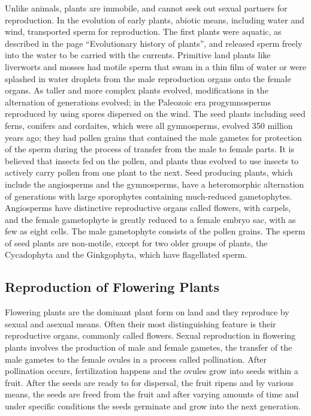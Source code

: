 Unlike animals, plants are immobile, and cannot seek out sexual partners for reproduction. In the evolution of early plants, abiotic means, including water and wind, transported sperm for reproduction. The first plants were aquatic, as described in the page ``Evolutionary history of plants'', and released sperm freely into the water to be carried with the currents. Primitive land plants like liverworts and mosses had motile sperm that swam in a thin film of water or were splashed in water droplets from the male reproduction organs onto the female organs. As taller and more complex plants evolved, modifications in the alternation of generations evolved; in the Paleozoic era progymnosperms reproduced by using spores dispersed on the wind. The seed plants including seed ferns, conifers and cordaites, which were all gymnosperms, evolved 350 million years ago; they had pollen grains that contained the male gametes for protection of the sperm during the process of transfer from the male to female parts. It is believed that insects fed on the pollen, and plants thus evolved to use insects to actively carry pollen from one plant to the next. Seed producing plants, which include the angiosperms and the gymnosperms, have a heteromorphic alternation of generations with large sporophytes containing much-reduced gametophytes. Angiosperms have distinctive reproductive organs called flowers, with carpels, and the female gametophyte is greatly reduced to a female embryo sac, with as few as eight cells. The male gametophyte consists of the pollen grains. The sperm of seed plants are non-motile, except for two older groups of plants, the Cycadophyta and the Ginkgophyta, which have flagellated sperm.

\hypertarget{reproduction-of-flowering-plants}{%
\subsection{Reproduction of Flowering Plants}\label{reproduction-of-flowering-plants}}

Flowering plants are the dominant plant form on land and they reproduce by sexual and asexual means. Often their most distinguishing feature is their reproductive organs, commonly called flowers. Sexual reproduction in flowering plants involves the production of male and female gametes, the transfer of the male gametes to the female ovules in a process called pollination. After pollination occurs, fertilization happens and the ovules grow into seeds within a fruit. After the seeds are ready to for dispersal, the fruit ripens and by various means, the seeds are freed from the fruit and after varying amounts of time and under specific conditions the seeds germinate and grow into the next generation.

